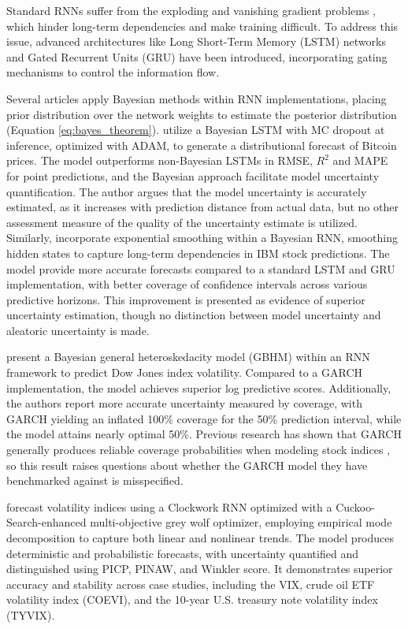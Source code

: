 Standard RNNs suffer from the exploding and vanishing gradient problems \parencite{Pascanu2013Difficulty}, which hinder long-term dependencies and make training difficult. To address this issue, advanced architectures like Long Short-Term Memory (LSTM) networks \parencite{Hochreiter1997LSTM} and Gated Recurrent Units (GRU) \parencite{Cho2014Learning} have been introduced, incorporating gating mechanisms to control the information flow. 

Several articles apply Bayesian methods within RNN implementations, placing prior distribution over the network weights to estimate the posterior distribution (Equation \ref{eq:bayes_theorem}). \textcite{Hassan2024Bitcoin} utilize a Bayesian LSTM with MC dropout at inference, optimized with ADAM, to generate a distributional forecast of Bitcoin prices. The model outperforms non-Bayesian LSTMs in RMSE, $R^2$ and MAPE for point predictions, and the Bayesian approach facilitate model uncertainty quantification. The author argues that the model uncertainty is accurately estimated, as it increases with prediction distance from actual data, but no other assessment measure of the quality of the uncertainty estimate is utilized. Similarly, \textcite{Dixon2022Industrial} incorporate exponential smoothing within a Bayesian RNN, smoothing hidden states to capture long-term dependencies in IBM stock predictions. The model provide more accurate forecasts compared to a standard LSTM and GRU implementation, with better coverage of confidence intervals across various predictive horizons. This improvement is presented as evidence of superior uncertainty estimation, though no distinction between model uncertainty and aleatoric uncertainty is made.

\textcite{Parker2021BayesianHeteroskedastic} present a Bayesian general heteroskedacity model (GBHM) within an RNN framework to predict Dow Jones index volatility. Compared to a GARCH implementation, the model achieves superior log predictive scores. Additionally, the authors report more accurate uncertainty measured by coverage, with GARCH yielding an inflated 100\% coverage for the 50\% prediction interval, while the model attains nearly optimal 50\%. Previous research has shown that GARCH generally produces reliable coverage probabilities when modeling stock indices \parencite{Rippel2011ValueAR}, so this result raises questions about whether the GARCH model they have benchmarked against is misspecified.

\textcite{Tian2023} forecast volatility indices using a Clockwork RNN optimized with a Cuckoo-Search-enhanced multi-objective grey wolf optimizer, employing empirical mode decomposition to capture both linear and nonlinear trends. The model produces deterministic and probabilistic forecasts, with uncertainty quantified and distinguished using PICP, PINAW, and Winkler score. It demonstrates superior accuracy and stability across case studies, including the VIX, crude oil ETF volatility index (COEVI), and the 10-year U.S. treasury note volatility index (TYVIX).

